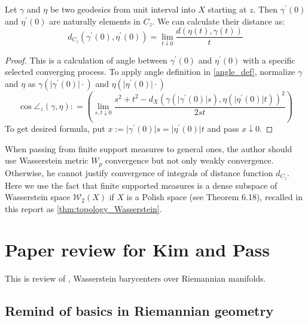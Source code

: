 \begin{thm}
	Let $\gamma$ and  $\eta$ be two geodesics from unit interval into $X$ starting at $z$. Then $\gamma^\prime(0)$ and $\eta^\prime(0)$ are naturally elements in $C_z$. We can calculate their distance as:
	\[  d_{C_z}(\gamma^\prime(0),\eta^\prime(0))=\lim _ { t \downarrow 0 } \frac  {d ( \eta ( t ) , \gamma ( t ) )  }{ t }\]
\end{thm}

\begin{proof}
	This is a calculation of angle between $\gamma^\prime(0)$ and $\eta^\prime(0)$ with a specific selected converging process. To apply angle definition in \cref{angle_def}, normalize $\gamma$ and $\eta$ as $\gamma\left(\vert\gamma^\prime(0)\vert \cdot\right)$ and $\eta\left(\vert\eta^\prime(0)\vert \cdot\right)$
	\[
		\cos\angle _ { z } ( \gamma , \eta ): = \left( \lim _ { s , t \downarrow 0 } \frac { s ^ { 2 } + t ^ { 2 } - d _ { X }\left( \gamma (\vert \gamma^\prime(0)\vert s ) , \eta (\vert \eta^\prime(0)\vert  t ) \right) ^ { 2 } } { 2 s t } \right)
	\]
	To get desired formula, put $ x := \vert  \gamma^\prime(0)\vert s =\vert \eta^\prime(0)\vert t $ and pass $x \downarrow 0$.
\end{proof}

\begin{rmk}
	When passing from finite support measures to general ones, the author should use Wasserstein metric $W_p$ convergence but not only weakly convergence. Otherwise, he cannot justify convergence of integrals of distance function $d_{C_z}$. Here we use the fact that finite supported measures is a dense subspace of Wasserstein space $\mathcal{W}_2(X)$ if $X$ is a Polish space (see \cite{villani2008optimal} Theorem 6.18), recalled in this report as \cref{thm:topology_Wasserstein}.
\end{rmk}

\section{Paper review for Kim and Pass}

This is review of \cite{KIM2017640},
Wasserstein barycenters over Riemannian manifolds.

\subsection{Remind of basics in Riemannian geometry}


